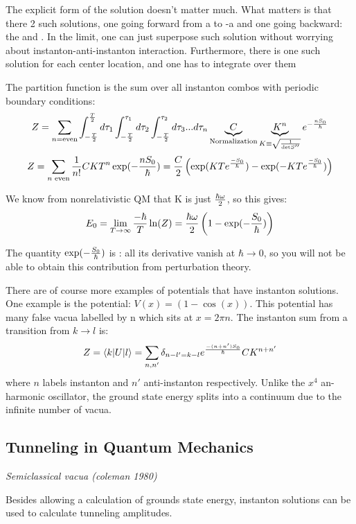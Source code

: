 \documentclass[11pt]{scrartcl}
\begin{document}
The explicit form of the solution doesn't matter much.  What matters is that there 2 such solutions, one going forward from a to -a and one going backward: the  and .  In the  limit, one can just superpose such solution without worrying about instanton-anti-instanton interaction.  Furthermore, there is one such solution for each center location, and one has to integrate over them

The partition function is the sum over all instanton combos with periodic boundary conditions:
\[Z = \sum_{n = \text{even}} \int_{-{T \over 2}}^{T \over 2} d \tau_1 
\int_{-{T \over 2}}^{\tau_1} d \tau_2
\int_{-{T \over 2}}^{\tau_2} d \tau_3 ... d \tau_n \underbrace{C}_{\text{Normalization}} \underbrace{K^n}_{K \equiv \sqrt{1 \over \mathrm{det} S''}} e^{- {nS_0 \over \hbar}} \]
\[Z = \sum_{n \text{ even}} {1 \over n!} C {KT}^n \exp(- {n S_0 \over \hbar}) = {C \over 2} \left(\exp(KT e^{-S_0 \over \hbar} ) - \exp(-KT e^{-S_0 \over \hbar} ) \right) \]

We know from nonrelativistic QM that K is just ${\hbar \omega \over 2}$, so this gives:
\[E_0 = \lim_{T \rightarrow \infty} {-\hbar \over T} \ln(Z) = {\hbar \omega \over 2} \left( 1 - \exp(-{S_0 \over \hbar}) \right) \]

The quantity $\exp(- {S_0 \over \hbar})$ is : all its derivative vanish at $\hbar \rightarrow 0$, so you will not be able to obtain this contribution from perturbation theory.

There are of course more examples of potentials that have instanton solutions.  One example is the  potential:
$V(x) = (1- \cos(x)) $.  This potential has many false vacua labelled by n which sits at $x = 2 \pi n$.  The instanton sum from a transition from $k \rightarrow l$ is:
\[ Z = \braket{k | U | l}  = \sum_{n, n'} \delta_{n-l' = k-l} e^{- (n+n')S_0 \over \hbar} C K^{n+n'} \]
where $n$ labels instanton and $n'$ anti-instanton respectively.  Unlike the $x^4$ an-harmonic oscillator, the ground state energy splits into a continuum due to the infinite number of vacua.

\subsection{Tunneling in Quantum Mechanics}
\emph{Semiclassical vacua (coleman 1980)}

Besides allowing a calculation of grounds state energy, instanton solutions can be used to calculate tunneling amplitudes.
\end{document}
